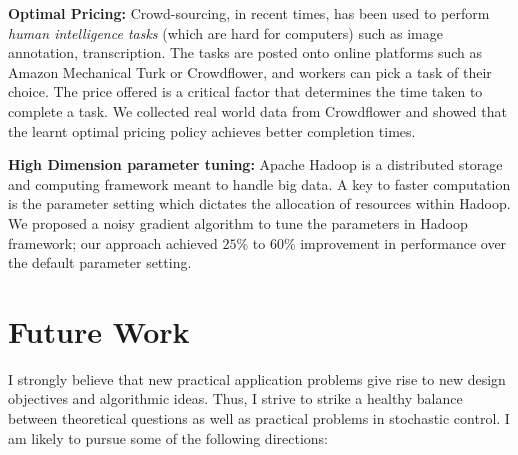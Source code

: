 \documentclass[onecolumn,12pt]{IEEEtran}
\begin{document}
\textbf{Optimal Pricing:} Crowd-sourcing, in recent times, has been used to perform \emph{human intelligence tasks} (which are hard for computers) such as image annotation, transcription. The tasks are posted onto online platforms such as Amazon Mechanical Turk or Crowdflower, and workers can pick a task of their choice. The price offered is a critical factor that determines the time taken to complete a task.
 We collected real world data from Crowdflower and showed \cite{hcomp} that the learnt optimal pricing policy achieves better completion times.
 
 \textbf{High Dimension parameter tuning:} Apache Hadoop is a distributed storage and computing framework meant to handle big data. A key to faster computation is the parameter setting which dictates the allocation of resources within Hadoop. We proposed \cite{hadoop} a noisy gradient algorithm to tune the parameters in Hadoop framework; our approach achieved $25\%$ to $60\%$ improvement in performance over the default parameter setting.



\section{Future Work}\label{future}
 I strongly believe that new practical application problems give rise to new design objectives and algorithmic ideas.  Thus, I strive to strike a healthy balance between theoretical questions as well as practical problems in stochastic control. I am likely to pursue some of the following directions:
 
\end{document}
